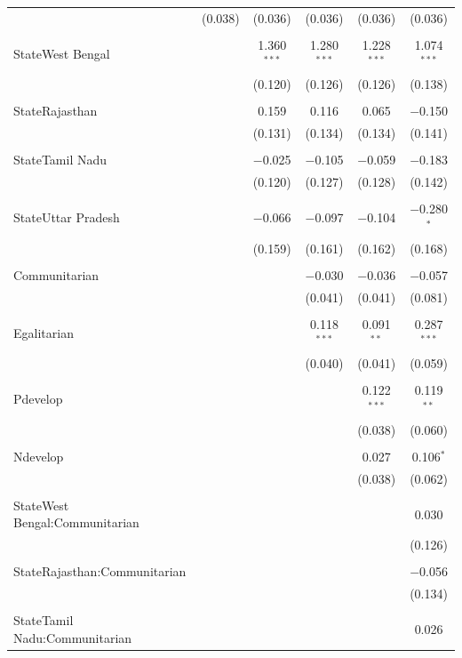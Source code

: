 \documentclass[
]{article}
\begin{document}
\begin{landscape}
\begin{table}[!htbp]
\begin{tabular}{@{\extracolsep{5pt}}lccccc}
  & (0.038) & (0.036) & (0.036) & (0.036) & (0.036) \\ 
  & & & & & \\ 
 StateWest Bengal &  & 1.360$^{***}$ & 1.280$^{***}$ & 1.228$^{***}$ & 1.074$^{***}$ \\ 
  &  & (0.120) & (0.126) & (0.126) & (0.138) \\ 
  & & & & & \\ 
 StateRajasthan &  & 0.159 & 0.116 & 0.065 & $-$0.150 \\ 
  &  & (0.131) & (0.134) & (0.134) & (0.141) \\ 
  & & & & & \\ 
 StateTamil Nadu &  & $-$0.025 & $-$0.105 & $-$0.059 & $-$0.183 \\ 
  &  & (0.120) & (0.127) & (0.128) & (0.142) \\ 
  & & & & & \\ 
 StateUttar Pradesh &  & $-$0.066 & $-$0.097 & $-$0.104 & $-$0.280$^{*}$ \\ 
  &  & (0.159) & (0.161) & (0.162) & (0.168) \\ 
  & & & & & \\ 
 Communitarian &  &  & $-$0.030 & $-$0.036 & $-$0.057 \\ 
  &  &  & (0.041) & (0.041) & (0.081) \\ 
  & & & & & \\ 
 Egalitarian &  &  & 0.118$^{***}$ & 0.091$^{**}$ & 0.287$^{***}$ \\ 
  &  &  & (0.040) & (0.041) & (0.059) \\ 
  & & & & & \\ 
 Pdevelop &  &  &  & 0.122$^{***}$ & 0.119$^{**}$ \\ 
  &  &  &  & (0.038) & (0.060) \\ 
  & & & & & \\ 
 Ndevelop &  &  &  & 0.027 & 0.106$^{*}$ \\ 
  &  &  &  & (0.038) & (0.062) \\ 
  & & & & & \\ 
 StateWest Bengal:Communitarian &  &  &  &  & 0.030 \\ 
  &  &  &  &  & (0.126) \\ 
  & & & & & \\ 
 StateRajasthan:Communitarian &  &  &  &  & $-$0.056 \\ 
  &  &  &  &  & (0.134) \\ 
  & & & & & \\ 
 StateTamil Nadu:Communitarian &  &  &  &  & 0.026 \\ 

\end{tabular}
\end{table}
\end{landscape}
\end{document}
